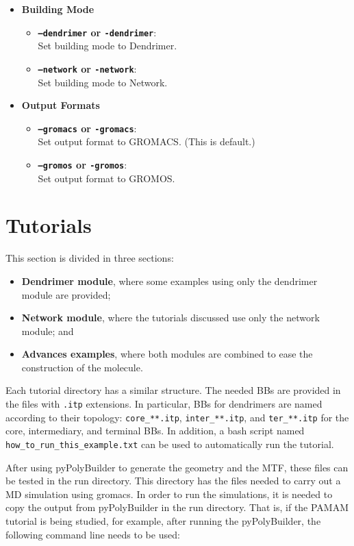 \documentclass[12pt]{article}
\begin{document}
\begin{itemize}
\item \textbf{Building Mode}
\begin{itemize}
  \item \textbf{\texttt{--dendrimer} or \texttt{-dendrimer}}:\\
    Set building mode to Dendrimer.
  \item \textbf{\texttt{--network} or \texttt{-network}}:\\
    Set building mode to Network.
\end{itemize}

\item \textbf{Output Formats}
\begin{itemize}
  \item \textbf{\texttt{--gromacs} or \texttt{-gromacs}}:\\
    Set output format to GROMACS. (This is default.)
  \item \textbf{\texttt{--gromos} or \texttt{-gromos}}:\\
    Set output format to GROMOS.
\end{itemize}

\end{itemize}


\section{Tutorials}

This section is divided in three sections:
\begin{itemize}
    \item \textbf{Dendrimer module},
    where some examples using only the dendrimer module are provided;
    \item \textbf{Network module},
    where the tutorials discussed use only the network module; and
    \item \textbf{Advances examples},
    where both modules are combined to ease the construction of the molecule.
\end{itemize}

Each tutorial directory has a similar structure. 
The needed BBs are provided in the files with \texttt{.itp} extensions.
In particular, BBs for dendrimers are named according to their topology: \texttt{core\_**.itp}, \texttt{inter\_**.itp}, and \texttt{ter\_**.itp} for the core, intermediary, and terminal BBs.
In addition, a bash script named \texttt{how\_to\_run\_this\_example.txt} can be used to automatically run the tutorial.

After using pyPolyBuilder to generate the geometry and the MTF, these files can be tested in the run directory.
This directory has the files needed to carry out a MD simulation using gromacs.
In order to run the simulations, it is needed to copy the output from pyPolyBuilder in the run directory.
That is, if the PAMAM tutorial is being studied, for example, after running the pyPolyBuilder, the following command line needs to be used:
\end{document}
